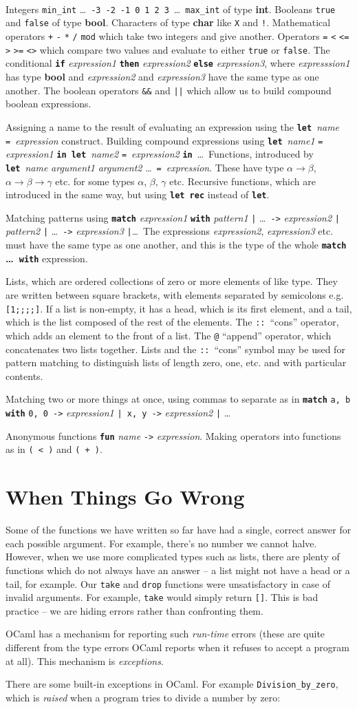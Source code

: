 \documentclass[]{book}
\makeatletter
\newcommand\upquote[1]{\textquotesingle#1\textquotesingle}
\newcommand{\sofarstartingoff}{

\noindent 1

\noindent Integers \texttt{min\_int} \ldots\ \texttt{-3}\ \texttt{-2}\ \texttt{-1}\ \texttt{0}\ \texttt{1}\ \texttt{2}\ \texttt{3}\ \ldots\ \texttt{max\_int} of type \textbf{\textrm{int}}. Booleans \texttt{true} and \texttt{false} of type \textbf{\textrm{bool}}. \noindent Characters of type \textrm{\textbf{char}} like \texttt{\upquote{X}} and \texttt{\upquote{!}}. Mathematical operators \texttt{+} \texttt{-} \texttt{*} \texttt{/} \texttt{mod} which take two integers and give another. Operators \texttt{=} \texttt{<} \texttt{<=} \texttt{>} \texttt{>=} \texttt{<>} which compare two values and evaluate to either \texttt{true} or \texttt{false}. The conditional \textbf{\texttt{if}} \textit{expression1} \textbf{\texttt{then}} \textit{expression2} \textbf{\texttt{else}} \textit{expression3}, where \textit{expresssion1} has type \textrm{\textbf{bool}} and \textit{expression2} and \textit{expression3} have the same type as one another. The boolean operators \texttt{\&\&} and \texttt{||} which allow us to build compound boolean expressions.}
\newcommand{\sofarfunctions}
{
\noindent 2

\noindent Assigning a name to the result of evaluating an expression using the \textbf{\texttt{let}}\ \textit{name} \texttt{=}\ \textit{expression} construct. Building compound expressions using \textbf{\texttt{let}}\ \textit{name1} \texttt{=} \textit{expression1} \textbf{\texttt{in}}\ \textbf{\texttt{let}}\ \textit{name2} \texttt{=}\ \textit{expression2} \textbf{\texttt{in}}\ \ldots \ Functions, introduced by \textbf{\texttt{let}}\ \textit{name} \textit{argument1} \textit{argument2} \ldots\ \texttt{=}\ \textit{expression}. These have type $\alpha \rightarrow \beta$, $\alpha \rightarrow \beta \rightarrow \gamma$ etc. for some types $\alpha$, $\beta$, $\gamma$ etc. Recursive functions, which are introduced in the same way, but using \textbf{\texttt{let rec}} instead of \textbf{\texttt{let}}.}
\newcommand{\sofarcasebycase}
{\noindent 3

\noindent Matching patterns using \textbf{\texttt{match}} \textit{expression1} \textbf{\texttt{with}} \textit{pattern1} \texttt{|} \ldots\ \texttt{->} \textit{expression2} \texttt{|} \textit{pattern2} \texttt{|} \ldots\ \texttt{->} \textit{expression3} \texttt{|}\ldots \ The expressions \textit{expression2}, \textit{expression3} etc. must have the same type as one another, and this is the type of the whole \textbf{\texttt{match} \ldots\ \texttt{with}} expression.}
\newcommand{\sofarlistingthings}
{
\noindent 4

\noindent Lists, which are ordered collections of zero or more elements of like type. They are written between square brackets, with elements separated by semicolons e.g. \texttt{[1;\! 2;\! 3;\! 4;\! 5]}. If a list is non-empty, it has a head, which is its first element, and a tail, which is the list composed of the rest of the elements. The \texttt{::}\ ``cons'' operator, which adds an element to the front of a list. The \texttt{@} ``append'' operator, which concatenates two lists together. Lists and the \texttt{::}\ ``cons'' symbol may be used for pattern matching to distinguish lists of length zero, one, etc. and with particular contents.}
\newcommand{\sofarsortingthings}
{
\noindent 5

\noindent Matching two or more things at once, using commas to separate as in \texttt{\textbf{match}} \texttt{a, b} \textbf{\texttt{with}} \texttt{0, 0 ->} \textit{expression1} \texttt{|\ x, y ->} \textit{expression2} \texttt{|} \ldots
}
\newcommand{\sofarfunctionsuponfunctions}
{
\noindent 6

\noindent Anonymous functions \textbf{\texttt{fun}} \textit{name} \texttt{->} \textit{expression}. Making operators into functions as in \texttt{(\! <\! )} and \texttt{(\! +\! )}.
}
\makeatother
\begin{document}
\cleardoublepage
\thispagestyle{empty}
\chapter*{}
\\

{\footnotesize
\sofarstartingoff

\vspace{\baselineskip}
\sofarfunctions

\vspace{\baselineskip}
\sofarcasebycase

\vspace{\baselineskip}
\sofarlistingthings

\vspace{\baselineskip}
\sofarsortingthings

\vspace{\baselineskip}
\sofarfunctionsuponfunctions
}

\pagestyle{empty}

\chapter{When Things Go Wrong}
\pagestyle{fancy}
\label{whenthingsgowrong}

Some of the functions we have written so far have had a single, correct answer for each possible argument. For example, there's no number we cannot halve. However, when we use more complicated types such as lists, there are plenty of functions which do not always have an answer -- a list might not have a head or a tail, for example. Our \texttt{take} and \texttt{drop} functions were unsatisfactory in case of invalid arguments. For example, \texttt{take\! [\upquote{a}]} would simply return \texttt{[]}. This is bad practice -- we are hiding errors rather than confronting them.

OCaml has a mechanism for reporting such \textit{run-time} errors (these are quite different from the type errors OCaml reports when it refuses to accept a program at all). This mechanism is \textit{exceptions}.

There are some built-in exceptions in OCaml. For example \texttt{Division\_by\_zero}, which is \textit{raised} when a program tries to divide a number by zero:
\end{document}

